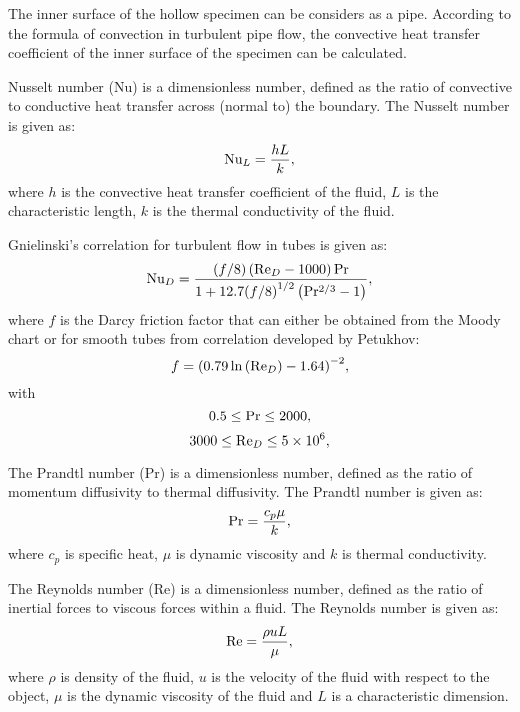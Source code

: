 
The inner surface of the hollow specimen can be considers as a pipe.
According to the formula of convection in turbulent pipe flow, the convective heat transfer coefficient of the inner surface of the specimen can be calculated.

Nusselt number (Nu) is a dimensionless number, defined as the ratio of convective to conductive heat transfer across (normal to) the boundary.
The Nusselt number is given as:
\[{\rm{N}}{{\rm{u}}_L} = \frac{{hL}}{k},\]
where $h$ is the convective heat transfer coefficient of the fluid, $L$ is the characteristic length, $k$ is the thermal conductivity of the fluid.

Gnielinski's correlation for turbulent flow in tubes is given as:
\[{\rm{N}}{{\rm{u}}_D} = \frac{{\left( {f/8} \right)\left( {{\rm{R}}{{\rm{e}}_D} - 1000} \right){\rm{Pr}}}}{{1 + 12.7{{(f/8)}^{1/2}}\left( {{\rm{P}}{{\rm{r}}^{2/3}} - 1} \right)}},\]
where $f$ is the Darcy friction factor that can either be obtained from the Moody chart or for smooth tubes from correlation developed by Petukhov:
\[f = {\left( {0.79\ln \left( {{\rm{R}}{{\rm{e}}_D}} \right) - 1.64} \right)^{ - 2}},\]
with
\[0.5 \le {\rm{Pr}} \le 2000,\]
\[3000 \le {\rm{R}}{{\rm{e}}_D} \le 5 \times {10^6},\]

The Prandtl number (Pr) is a dimensionless number, defined as the ratio of momentum diffusivity to thermal diffusivity.
The Prandtl number is given as:
\[{\rm{Pr}} = \frac{{{c_p}\mu }}{k},\]
where
$c_{p}$ is specific heat, $\mu$ is dynamic viscosity and $k$ is thermal conductivity.

The Reynolds number (Re) is a dimensionless number, defined as the ratio of inertial forces to viscous forces within a fluid.
The Reynolds number is given as:
\[{\rm{Re}} = \frac{{\rho uL}}{\mu },\]
where
$\rho$ is density of the fluid, $u$ is the velocity of the fluid with respect to the object, $\mu$ is the dynamic viscosity of the fluid and $L$ is a characteristic dimension.

